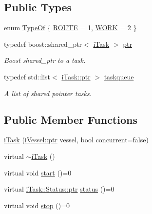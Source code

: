 \subsection*{Public Types}
\begin{DoxyCompactItemize}
\item 
enum \hyperlink{classo_cpt_1_1i_task_a10d8726eb8957c2c305f468cf15b9f11}{Type\+Of} \{ \hyperlink{classo_cpt_1_1i_task_a10d8726eb8957c2c305f468cf15b9f11a7ca85240095e3a76c70f5535d26c4dd3}{R\+O\+U\+TE} = 1, 
\hyperlink{classo_cpt_1_1i_task_a10d8726eb8957c2c305f468cf15b9f11a1ec34e80717bb96ddd8376ff12d1b4c9}{W\+O\+RK} = 2
 \}
\item 
typedef boost\+::shared\+\_\+ptr$<$ \hyperlink{classo_cpt_1_1i_task}{i\+Task} $>$ \hyperlink{classo_cpt_1_1i_task_add2b02b5c97e63a1b7d6943ea4571543}{ptr}
\begin{DoxyCompactList}\small\item\em Boost shared\+\_\+ptr to a task. \end{DoxyCompactList}\item 
typedef std\+::list$<$ \hyperlink{classo_cpt_1_1i_task_add2b02b5c97e63a1b7d6943ea4571543}{i\+Task\+::ptr} $>$ \hyperlink{classo_cpt_1_1i_task_a8f949d091241347ea0cdfb8625b4dbca}{taskqueue}
\begin{DoxyCompactList}\small\item\em A list of shared pointer tasks. \end{DoxyCompactList}\end{DoxyCompactItemize}
\subsection*{Public Member Functions}
\begin{DoxyCompactItemize}
\item 
\hyperlink{classo_cpt_1_1i_task_a5b5affdc2f5213d8c5f11e8cd1cda517}{i\+Task} (\hyperlink{classo_cpt_1_1i_vessel_a43711a596f3bdfd0ca732ed3901edc97}{i\+Vessel\+::ptr} vessel, bool concurrent=false)
\item 
virtual \hyperlink{classo_cpt_1_1i_task_aa2c1053421fff92430b5912e0d3c7fc7}{$\sim$i\+Task} ()
\item 
virtual void \hyperlink{classo_cpt_1_1i_task_aedd48e3c4df48aaae0738ce3863e222f}{start} ()=0
\item 
virtual \hyperlink{classo_cpt_1_1i_task_1_1_status_aaf766c58d038e2defc3de2dddb92d1eb}{i\+Task\+::\+Status\+::ptr} \hyperlink{classo_cpt_1_1i_task_a8d6126b2e337a0ab39fdef1d8d7b73b9}{status} ()=0
\item 
virtual void \hyperlink{classo_cpt_1_1i_task_aedb88813b16914598dee9561813e56e8}{stop} ()=0
\end{DoxyCompactItemize}
